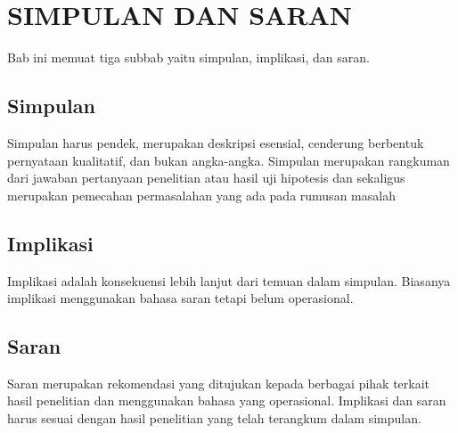 \chapter{SIMPULAN DAN SARAN}
Bab ini memuat tiga subbab yaitu simpulan, implikasi, dan saran.

\section{Simpulan}
Simpulan harus pendek, merupakan deskripsi esensial, cenderung berbentuk pernyataan kualitatif, dan bukan angka-angka. Simpulan merupakan rangkuman dari jawaban pertanyaan penelitian atau hasil uji hipotesis dan sekaligus merupakan pemecahan permasalahan yang ada pada rumusan masalah

\section{Implikasi}
Implikasi adalah konsekuensi lebih lanjut dari temuan dalam simpulan. Biasanya implikasi menggunakan bahasa saran tetapi belum operasional.

\section{Saran}
Saran merupakan rekomendasi yang ditujukan kepada berbagai pihak terkait hasil penelitian dan menggunakan bahasa yang operasional. Implikasi dan saran harus sesuai dengan hasil penelitian yang telah terangkum dalam simpulan.